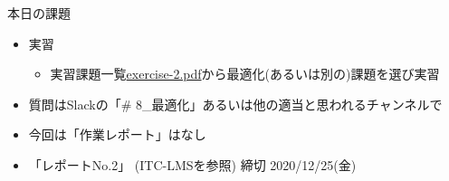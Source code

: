 \documentclass[10pt,dvipdfmx]{beamer}
\begin{document}
\begin{frame}[t]{本日の課題}
  \begin{itemize}
  \item 実習
    \begin{itemize}
    \item 実習課題一覧\href{https://github.com/todo-group/ComputerExperiments/releases/tag/2020a-computer2}{exercise-2.pdf}から最適化(あるいは別の)課題を選び実習
    \end{itemize}
  \item 質問はSlackの「\# 8\_最適化」あるいは他の適当と思われるチャンネルで
  \item 今回は「作業レポート」はなし
  \item 「レポートNo.2」 (ITC-LMSを参照) 締切 2020/12/25(金)
  \end{itemize}
\end{frame}
\end{document}
